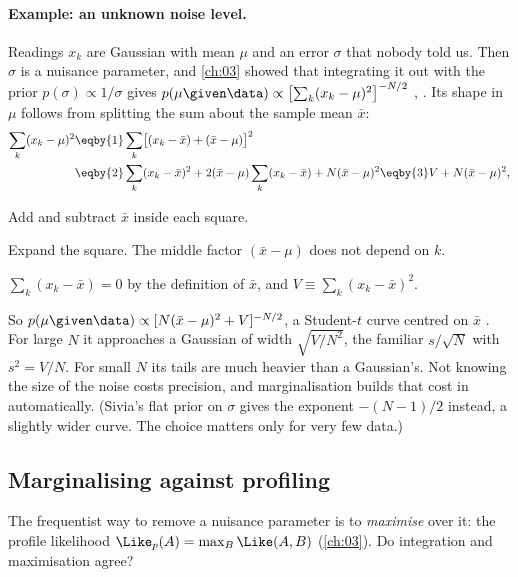 \paragraph{Example: an unknown noise level.}
Readings $x_k$ are Gaussian with mean $\mu$ and an error $\sigma$ that nobody told us.
Then $\sigma$ is a nuisance parameter, and \cref{ch:03} showed that integrating it out
with the prior $p(\sigma)\propto1/\sigma$ gives $p(\mu\given\data)\propto
\bigl[\sum_k(x_k-\mu)^2\bigr]^{-N/2}$ , .
Its shape in $\mu$ follows from splitting the sum about the sample mean $\bar x$:
\begin{align*}
  \sum_k(x_k-\mu)^2
  &\eqby{1}\sum_k\bigl[(x_k-\bar x)+(\bar x-\mu)\bigr]^2\\
  &\eqby{2}\sum_k(x_k-\bar x)^2+2(\bar x-\mu)\sum_k(x_k-\bar x)+N(\bar x-\mu)^2
  \eqby{3}V+N(\bar x-\mu)^2,
\end{align*}
\begin{explain}
  \item Add and subtract $\bar x$ inside each square.
  \item Expand the square. The middle factor $(\bar x-\mu)$ does not depend on $k$.
  \item $\sum_k(x_k-\bar x)=0$ by the definition of $\bar x$, and $V\equiv\sum_k(x_k-\bar x)^2$.
\end{explain}
So $p(\mu\given\data)\propto[N(\bar x-\mu)^2+V]^{-N/2}$, a Student-$t$ curve centred on
$\bar x$ . For large $N$ it approaches a Gaussian of width
$\sqrt{V/N^2}$, the familiar $s/\sqrt N$ with $s^2=V/N$. For small $N$ its tails are
much heavier than a Gaussian's. Not knowing the size of the noise costs precision, and
marginalisation builds that cost in automatically. (Sivia's flat prior on $\sigma$ gives the exponent
$-(N-1)/2$ instead, a slightly wider curve. The choice matters only for very few data.)

\subsection{Marginalising against profiling}

The frequentist way to remove a nuisance parameter is to \emph{maximise} over it: the
profile likelihood $\Like_p(A)=\max_B\Like(A,B)$ (\cref{ch:03}). Do integration and
maximisation agree?

